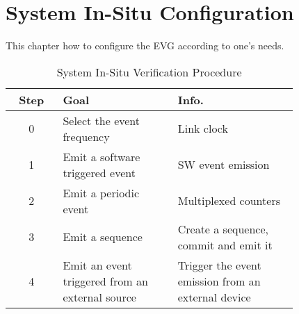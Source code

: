 \documentclass[11pt
  , a4paper
  , article
  , oneside
  , showtrims
]{memoir}
\begin{document}
\newpage
\chapter{System In-Situ Configuration}
This chapter how to configure the EVG according to one's needs.
\begin{table}[!htb]
  \centering
  \begin{tabular}{c|p{0.4\linewidth}|p{0.42\linewidth}}
    \toprule
    Step & Goal                                            & Info.                                                 \\\midrule
    0    & Select the event frequency                      & Link clock                                            \\\midrule
    1    & Emit a software triggered event                 & SW event emission                                     \\\midrule
    2    & Emit a periodic event                           & Multiplexed counters                                  \\\midrule
    3    & Emit a sequence                                 & Create a sequence, commit and emit it                 \\\midrule
    4    & Emit an event triggered from an external source & Trigger the event emission from an external device    \\\bottomrule
  \end{tabular}
  \caption[]{System In-Situ Verification Procedure}
  \label{table:checklist}
\end{table}
\end{document}
